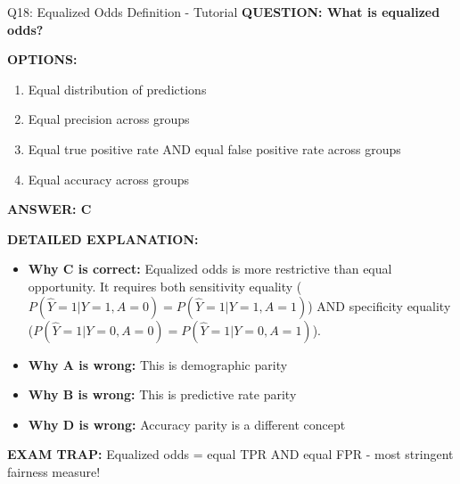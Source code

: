 \documentclass[8pt]{beamer}
\begin{document}
	\begin{frame}{Q18: Equalized Odds Definition - Tutorial}
		\fontsize{6.5}{7.5}\selectfont
		\textbf{QUESTION: What is equalized odds?}
		
		\vspace{0.1cm}
		\textbf{OPTIONS:}
		\begin{enumerate}
			\item Equal distribution of predictions
			\item Equal precision across groups
			\item Equal true positive rate AND equal false positive rate across groups
			\item Equal accuracy across groups
		\end{enumerate}
		
		\vspace{0.1cm}
		\textcolor{myblue}{\textbf{ANSWER: C}}
		
		\vspace{0.1cm}
		\textbf{DETAILED EXPLANATION:}
		\begin{itemize}
			\item \textbf{Why C is correct:} Equalized odds is more restrictive than equal opportunity. It requires both sensitivity equality ($P(\hat{Y}=1|Y=1,A=0) = P(\hat{Y}=1|Y=1,A=1)$) AND specificity equality ($P(\hat{Y}=1|Y=0,A=0) = P(\hat{Y}=1|Y=0,A=1)$).
			\item \textbf{Why A is wrong:} This is demographic parity
			\item \textbf{Why B is wrong:} This is predictive rate parity
			\item \textbf{Why D is wrong:} Accuracy parity is a different concept
		\end{itemize}
		
		\textcolor{myred}{\textbf{EXAM TRAP:}} Equalized odds = \textcolor{myblue}{equal TPR AND equal FPR} - most stringent fairness measure!
	\end{frame}
	
\end{document}
